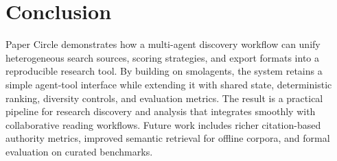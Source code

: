 \section{Conclusion}
Paper Circle demonstrates how a multi-agent discovery workflow can unify heterogeneous search sources, scoring strategies, and export formats into a reproducible research tool. By building on smolagents, the system retains a simple agent-tool interface while extending it with shared state, deterministic ranking, diversity controls, and evaluation metrics. The result is a practical pipeline for research discovery and analysis that integrates smoothly with collaborative reading workflows. Future work includes richer citation-based authority metrics, improved semantic retrieval for offline corpora, and formal evaluation on curated benchmarks.
